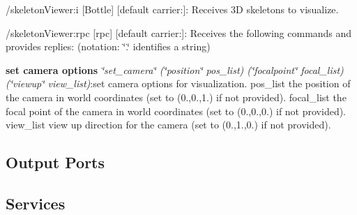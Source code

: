 \begin{DoxyItemize}
\item /skeleton\+Viewer\+:i \mbox{[}Bottle\mbox{]} \mbox{[}default carrier\+:\mbox{]}\+: Receives 3D skeletons to visualize.
\item /skeleton\+Viewer\+:rpc \mbox{[}rpc\mbox{]} \mbox{[}default carrier\+:\mbox{]}\+: Receives the following commands and provides replies\+: (notation\+: \char`\"{}.\char`\"{} identifies a string)
\begin{DoxyEnumerate}
\item {\bfseries{set camera options}} {\itshape \char`\"{}set\+\_\+camera\char`\"{} (\char`\"{}position\char`\"{} pos\+\_\+list) (\char`\"{}focalpoint\char`\"{} focal\+\_\+list) (\char`\"{}viewup\char`\"{} view\+\_\+list)}\+:set camera options for visualization. pos\+\_\+list the position of the camera in world coordinates (set to (0.,0.,1.) if not provided). focal\+\_\+list the focal point of the camera in world coordinates (set to (0.,0.,0.) if not provided). view\+\_\+list view up direction for the camera (set to (0.,1.,0.) if not provided).
\end{DoxyEnumerate}
\end{DoxyItemize}\hypertarget{group__skeletonViewer_outputports_sec}{}\subsection{Output Ports}\label{group__skeletonViewer_outputports_sec}
\hypertarget{group__skeletonViewer_services_sec}{}\subsection{Services}\label{group__skeletonViewer_services_sec}
